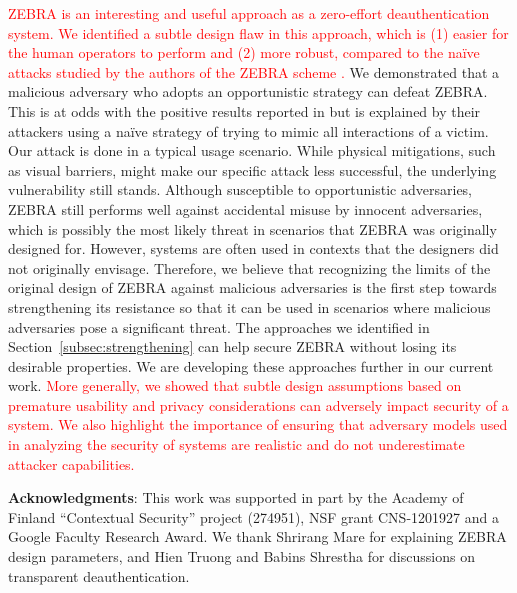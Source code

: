 \documentclass[conference]{IEEEtran}
\newcommand{\zebra}{ZEBRA\xspace}
\newif\ifanonymous
\newcommand\changeMika[1]{\textcolor{red}{#1}}
\newcommand\changeAsokan[1]{\textcolor{red}{#1}}
\newcommand\changeMika[1]{{#1}}
\newcommand\changeAsokan[1]{{#1}}
\begin{document}
\changeMika{\zebra is an interesting and useful approach as a 
zero-effort deauthentication system. We identified a subtle design flaw
in this approach, which is (1) easier for the human operators to 
perform and (2) more robust, compared to the na\"ive attacks
studied by the authors of the \zebra scheme \cite{mare2014zebra}.}
We demonstrated that a malicious adversary who adopts an
opportunistic strategy can defeat \zebra. This is at odds with the
positive results reported in \cite{mare2014zebra} but is explained by
their attackers using a na\"ive strategy of trying to mimic all
interactions of a victim. Our attack is done in a
typical usage scenario. While physical mitigations, such as visual
barriers, might make our specific attack less successful, the
underlying vulnerability still stands.  Although susceptible to
opportunistic adversaries, \zebra still performs well against
accidental misuse by innocent adversaries, which is possibly the most likely threat in scenarios that \zebra was originally designed for. However, systems are often used in contexts that the designers did not originally envisage. Therefore, we believe that recognizing the limits of the original design of \zebra against malicious adversaries is the first step towards strengthening its resistance so that it can be used in scenarios where malicious adversaries pose a significant threat.
The approaches we
identified in Section~\ref{subsec:strengthening} can help secure
\zebra without losing its desirable properties. We are developing
these approaches further in our current work.
\changeAsokan{More generally, we showed that subtle design assumptions based on premature usability and privacy considerations can adversely impact security of a system. We also highlight the importance of ensuring that adversary models used in analyzing the security of systems are realistic and do not underestimate attacker capabilities.}

 
\ifanonymous
\else
\vspace{3mm}
\noindent\textbf{Acknowledgments}: This work was supported in part by
the Academy of Finland ``Contextual Security'' project (274951),
NSF grant CNS-1201927 and a Google Faculty Research Award. 
We thank Shrirang Mare for explaining \zebra design parameters, and
Hien Truong and Babins Shrestha for discussions on
transparent deauthentication.
\fi

\balance

{\footnotesize 
}

\newpage
\appendix
\end{document}
